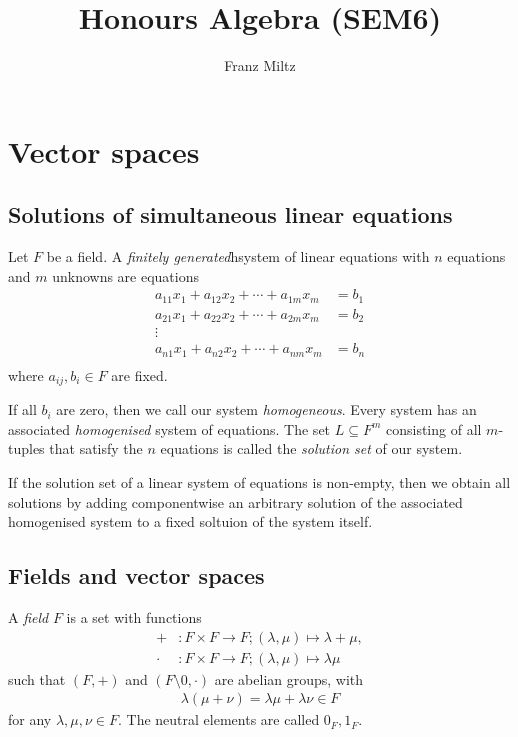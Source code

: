 \documentclass{article}
\begin{document}
\mkthmstwounified
\title{Honours Algebra (SEM6)}
\author{Franz Miltz}
\maketitle
\tableofcontents
\pagebreak

\section{Vector spaces}

\subsection{Solutions of simultaneous linear equations}

\begin{definition}
	Let $F$ be a field. A \emph{finitely generated}h{system of linear equations} with $n$ equations and
	$m$ unknowns are equations
	\begin{align*}
		a_{11}x_1 + a_{12}x_2 + \cdots + a_{1m}x_m & = b_1 \\
		a_{21}x_1 + a_{22}x_2 + \cdots + a_{2m}x_m & = b_2 \\
		\vdots                                             \\
		a_{n1}x_1 + a_{n2}x_2 + \cdots + a_{nm}x_m & = b_n \\
	\end{align*}
	where $a_{ij},b_i\in F$ are fixed.

	If all $b_i$ are zero, then we call our system \emph{homogeneous}. Every system
	has an associated \emph{homogenised} system of equations.
	The set $L\subseteq F^m$ consisting of all $m$-tuples that satisfy the
	$n$ equations is called the \emph{solution set} of our system.
\end{definition}

\begin{theorem}[Notes 1.1.4]
	If the solution set of a linear system of equations is non-empty, then we obtain
	all solutions by adding componentwise an arbitrary solution of the associated
	homogenised system to a fixed soltuion of the system itself.
\end{theorem}

\subsection{Fields and vector spaces}

\begin{definition}
	A \emph{field} $F$ is a set with functions
	\begin{align*}
		+     & : F\times F \to F ; (\lambda,\mu) \mapsto \lambda + \mu, \\
		\cdot & : F\times F \to F ; (\lambda,\mu) \mapsto \lambda \mu
	\end{align*}
	such that $(F,+)$ and $(F\setminus{0},\cdot)$ are abelian groups, with
	\begin{align*}
		\lambda(\mu + \nu) = \lambda \mu + \lambda \nu \in F
	\end{align*}
	for any $\lambda,\mu,\nu\in F$. The neutral elements are called $0_F,1_F$.
\end{definition}
\end{document}
